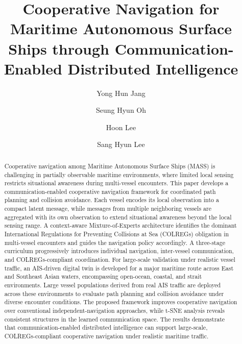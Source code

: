 \documentclass[final,5p,times,twocolumn]{elsarticle}
\begin{document}
\begin{frontmatter}

\title{Cooperative Navigation for Maritime Autonomous Surface Ships through Communication-Enabled Distributed Intelligence}

\author[label1]{Yong Hun Jang}
\author[label1]{Seung Hyun Oh}
\author[label2]{Hoon Lee}
\author[label1]{Sang Hyun Lee}



\begin{abstract}
{\color{violet}
Cooperative navigation among Maritime Autonomous Surface Ships (MASS) is challenging in partially observable maritime environments, where limited local sensing restricts situational awareness during multi-vessel encounters. This paper develops a communication-enabled cooperative navigation framework for coordinated path planning and collision avoidance. Each vessel encodes its local observation into a compact latent message, while messages from multiple neighboring vessels are aggregated with its own observation to extend situational awareness beyond the local sensing range. A context-aware Mixture-of-Experts architecture identifies the dominant International Regulations for Preventing Collisions at Sea (COLREGs) obligation in multi-vessel encounters and guides the navigation policy accordingly. A three-stage curriculum progressively introduces individual navigation, inter-vessel communication, and COLREGs-compliant coordination.
For large-scale validation under realistic vessel traffic, an AIS-driven digital twin is developed for a major maritime route across East and Southeast Asian waters, encompassing open-ocean, coastal, and strait environments. Large vessel populations derived from real AIS traffic are deployed across these environments to evaluate path planning and collision avoidance under diverse encounter conditions. The proposed framework improves cooperative navigation over conventional independent-navigation approaches, while t-SNE analysis reveals consistent structures in the learned communication space. The results demonstrate that communication-enabled distributed intelligence can support large-scale, COLREGs-compliant cooperative navigation under realistic maritime traffic.

}
\end{abstract}
\end{frontmatter}
\end{document}
